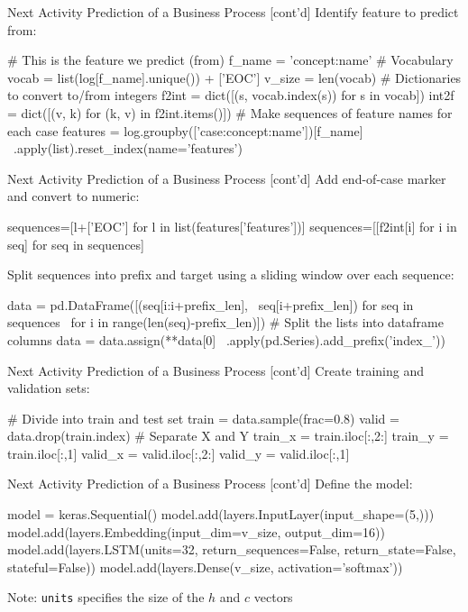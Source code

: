 \documentclass[ignorenonframetext,xcolor=x11names]{beamer}
\begin{document}
\begin{frame}[fragile]{Next Activity Prediction of a Business Process \small [cont'd]}
Identify feature to predict from:
\begin{pythoncode}
# This is the feature we predict (from)
f_name = 'concept:name'
# Vocabulary
vocab = list(log[f_name].unique()) + ['EOC']
v_size = len(vocab)
# Dictionaries to convert to/from integers
f2int = dict([(s, vocab.index(s)) for s in vocab])
int2f = dict([(v, k) for (k, v) in f2int.items()])
# Make sequences of feature names for each case
features = log.groupby(['case:concept:name'])[f_name] \
    .apply(list).reset_index(name='features')
\end{pythoncode}
\end{frame}


\begin{frame}[fragile]{Next Activity Prediction of a Business Process \small [cont'd]}
Add end-of-case marker and convert to numeric:
\begin{pythoncode}
sequences=[l+['EOC'] for l in list(features['features'])]
sequences=[[f2int[i] for i in seq] for seq in sequences]
\end{pythoncode}
Split sequences into prefix and target using a sliding window over each sequence:
\begin{pythoncode}
data = pd.DataFrame([(seq[i:i+prefix_len], \
    seq[i+prefix_len]) for seq in sequences \
    for i in range(len(seq)-prefix_len)])
# Split the lists into dataframe columns
data = data.assign(**data[0] \
    .apply(pd.Series).add_prefix('index_'))
\end{pythoncode}
\end{frame}

\begin{frame}[fragile]{Next Activity Prediction of a Business Process \small [cont'd]}
Create training and validation sets:
\begin{pythoncode}
# Divide into train and test set
train = data.sample(frac=0.8)
valid = data.drop(train.index)
# Separate X and Y
train_x = train.iloc[:,2:]
train_y = train.iloc[:,1]
valid_x = valid.iloc[:,2:]
valid_y = valid.iloc[:,1]
\end{pythoncode}
\end{frame}


\begin{frame}[fragile]{Next Activity Prediction of a Business Process \small [cont'd]}
Define the model:
\begin{pythoncode}
model = keras.Sequential()
model.add(layers.InputLayer(input_shape=(5,)))
model.add(layers.Embedding(input_dim=v_size,
                           output_dim=16))
model.add(layers.LSTM(units=32,
                      return_sequences=False,
                      return_state=False,
                      stateful=False))
model.add(layers.Dense(v_size, activation='softmax'))
\end{pythoncode}
Note: \texttt{units} specifies the size of the $h$ and $c$ vectors
\end{frame}
\end{document}
